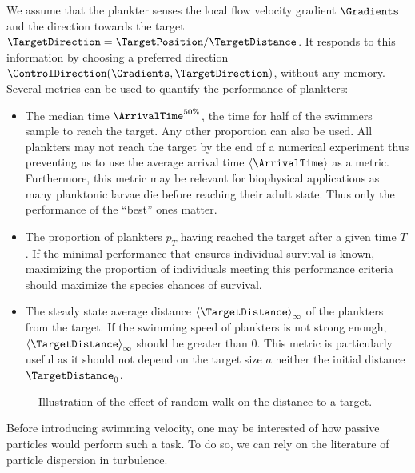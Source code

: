 We assume that the plankter senses the local flow velocity gradient $\Gradients$ and the direction towards the target $\TargetDirection = \TargetPosition/\TargetDistance$.
It responds to this information by choosing a preferred direction $\ControlDirection(\Gradients,\TargetDirection)$, without any memory.
Several metrics can be used to quantify the performance of plankters:
\begin{itemize}
	\item The median time $\ArrivalTime^{50\%}$, the time for half of the swimmers sample to reach the target. Any other proportion can also be used. All plankters may not reach the target by the end of a numerical experiment thus preventing us to use the average arrival time $\left\langle \ArrivalTime \right\rangle$ as a metric. Furthermore, this metric may be relevant for biophysical applications as many planktonic larvae die before reaching their adult state. Thus only the performance of the ``best'' ones matter.
	\item The proportion of plankters $p_T$ having reached the target after a given time $T$. If the minimal performance that ensures individual survival is known, maximizing the proportion of individuals meeting this performance criteria should maximize the species chances of survival.
	\item The steady state average distance $\left\langle \TargetDistance \right\rangle_{\infty}$ of the plankters from the target. If the swimming speed of plankters is not strong enough, $\left\langle \TargetDistance \right\rangle_{\infty}$ should be greater than $0$. This metric is particularly useful as it should not depend on the target size $a$ neither the initial distance $\TargetDistance_0$. 
\end{itemize}
\begin{wrapfigure}{R}{0.3\textwidth}
	\centering
	\def\svgwidth{0.3\textwidth}
	
  	\caption{Illustration of the effect of random walk on the distance to a target.}
\end{wrapfigure}

Before introducing swimming velocity, one may be interested of how passive particles would perform such a task. 
To do so, we can rely on the literature of particle dispersion in turbulence. 

